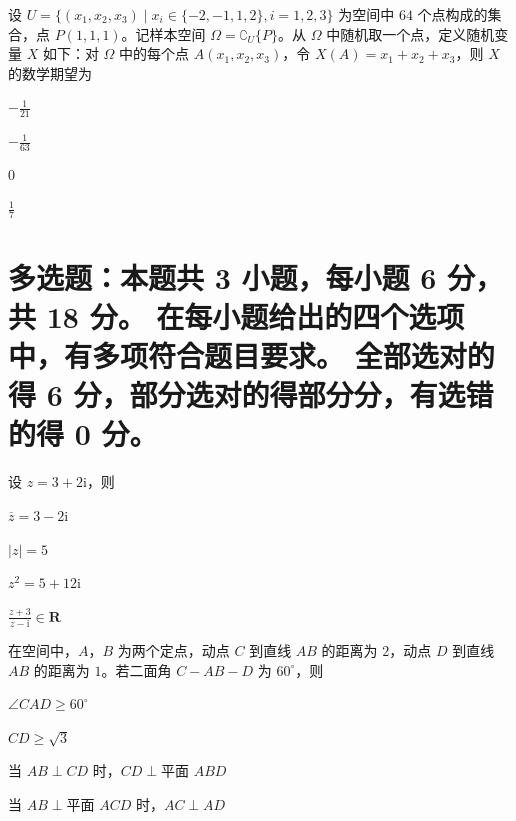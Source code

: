 \documentclass{exam-zh}
\begin{document}
\begin{question}
  设 $U = \{(x_1, x_2, x_3) \mid x_i \in \{-2, -1, 1, 2\}, i = 1, 2, 3\}$ 为空间中 $64$ 个点构成的集合，点 $P(1, 1, 1)$。记样本空间 $\Omega = \complement_{U} \{P\}$。从 $\Omega$ 中随机取一个点，定义随机变量 $X$ 如下：对 $\Omega$ 中的每个点 $A(x_1, x_2, x_3)$，令 $X(A) = x_1 + x_2 + x_3$，则 $X$ 的数学期望为 \paren
  \begin{choices}
    \item $-\frac{1}{21}$
    \item $-\frac{1}{63}$
    \item $0$
    \item $\frac{1}{7}$
  \end{choices}
\end{question}

\section{多选题：本题共 3 小题，每小题 6 分，共 18 分。
在每小题给出的四个选项中，有多项符合题目要求。
全部选对的得 6 分，部分选对的得部分分，有选错的得 0 分。}

\begin{question}
  设 $z = 3 + 2\mathrm{i}$，则 \paren
  \begin{choices}
    \item $\overline{z} = 3 - 2\mathrm{i}$
    \item $|z| = 5$
    \item $z^2 = 5 + 12\mathrm{i}$
    \item $\frac{z+3}{z-\mathrm{i}} \in \mathbf{R}$
  \end{choices}
\end{question}

\begin{question}
  在空间中，$A$，$B$ 为两个定点，动点 $C$ 到直线 $AB$ 的距离为 $2$，动点 $D$ 到直线 $AB$ 的距离为 $1$。若二面角 $C-AB-D$ 为 $60^\circ$，则 \paren
  \begin{choices}
    \item $\angle CAD \geqslant 60^\circ$
    \item $CD \geqslant \sqrt{3}$
    \item 当 $AB \perp CD$ 时，$CD \perp \text{平面 } ABD$
    \item 当 $AB \perp \text{平面 } ACD$ 时，$AC \perp AD$
  \end{choices}
\end{question}
\end{document}
